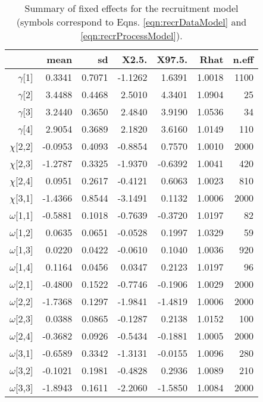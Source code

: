 \documentclass[11pt]{article}
\begin{document}
\begin{table}[ht]
\centering
\caption{Summary of fixed effects for the recruitment model (symbols correspond to Eqns. \ref{eqn:recrDataModel} and \ref{eqn:recrProcessModel}).} 
\label{table:recruitment}
\begin{tabular}{rrrrrrr}
  \hline
 & mean & sd & X2.5. & X97.5. & Rhat & n.eff \\ 
  \hline
 $\gamma$[1] & 0.3341 & 0.7071 & -1.1262 & 1.6391 & 1.0018 &  1100 \\ 
  $\gamma$[2] & 3.4488 & 0.4468 & 2.5010 & 4.3401 & 1.0904 &    25 \\ 
  $\gamma$[3] & 3.2440 & 0.3650 & 2.4840 & 3.9190 & 1.0536 &    34 \\ 
 $\gamma$[4] & 2.9054 & 0.3689 & 2.1820 & 3.6160 & 1.0149 &   110 \\ 
  $\chi$[2,2] & -0.0953 & 0.4093 & -0.8854 & 0.7570 & 1.0010 &  2000 \\ 
 $\chi$[2,3] & -1.2787 & 0.3325 & -1.9370 & -0.6392 & 1.0041 &   420 \\ 
   $\chi$[2,4] & 0.0951 & 0.2617 & -0.4121 & 0.6063 & 1.0023 &   810 \\ 
  $\chi$[3,1] & -1.4366 & 0.8544 & -3.1491 & 0.1132 & 1.0006 &  2000 \\ 
  $\omega$[1,1] & -0.5881 & 0.1018 & -0.7639 & -0.3720 & 1.0197 &    82 \\ 
  $\omega$[1,2] & 0.0635 & 0.0651 & -0.0528 & 0.1997 & 1.0329 &    59 \\ 
  $\omega$[1,3] & 0.0220 & 0.0422 & -0.0610 & 0.1040 & 1.0036 &   920 \\ 
  $\omega$[1,4] & 0.1164 & 0.0456 & 0.0347 & 0.2123 & 1.0197 &    96 \\ 
  $\omega$[2,1] & -0.4800 & 0.1522 & -0.7746 & -0.1906 & 1.0029 &  2000 \\ 
  $\omega$[2,2] & -1.7368 & 0.1297 & -1.9841 & -1.4819 & 1.0006 &  2000 \\ 
  $\omega$[2,3] & 0.0388 & 0.0865 & -0.1287 & 0.2138 & 1.0152 &   100 \\ 
  $\omega$[2,4] & -0.3682 & 0.0926 & -0.5434 & -0.1881 & 1.0005 &  2000 \\ 
  $\omega$[3,1] & -0.6589 & 0.3342 & -1.3131 & -0.0155 & 1.0096 &   280 \\ 
  $\omega$[3,2] & -0.1021 & 0.1981 & -0.4828 & 0.2936 & 1.0089 &   210 \\ 
  $\omega$[3,3] & -1.8943 & 0.1611 & -2.2060 & -1.5850 & 1.0084 &  2000 \\ 

\end{tabular}
\end{table}
\end{document}
